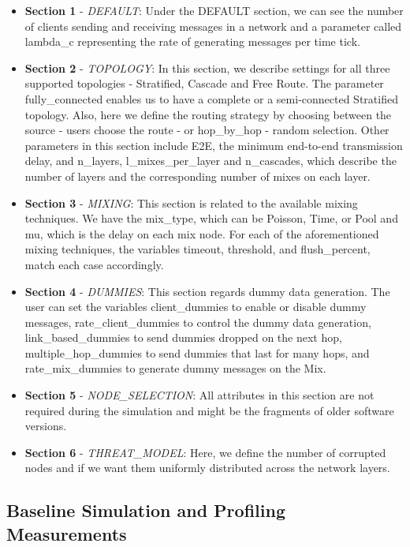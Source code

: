 \documentclass[logo,msc,cyber]{infthesis}   %
\begin{document}
\begin{itemize}
    \item \textbf{Section 1} - \emph{DEFAULT}: Under the DEFAULT section, we can
    see the number of clients sending and receiving messages in a network and a
    parameter called lambda\_c representing the rate of generating messages per
    time tick. 
    \item \textbf{Section 2} - \emph{TOPOLOGY}: In this section, we describe
    settings for all three supported topologies - Stratified, Cascade and Free
    Route. The parameter fully\_connected enables us to have a complete or a
    semi-connected Stratified topology. Also, here we define the routing
    strategy by choosing between the source - users choose the route - or
    hop\_by\_hop - random selection. Other parameters in this section include E2E,
    the minimum end-to-end transmission delay, and n\_layers, l\_mixes\_per\_layer
    and n\_cascades, which describe the number of layers and the corresponding
    number of mixes on each layer.
    \item \textbf{Section 3} - \emph{MIXING}: This section is related to the
    available mixing techniques. We have the mix\_type, which can be Poisson,
    Time, or Pool and mu, which is the delay on each mix node. For each of the
    aforementioned mixing techniques, the variables timeout, threshold, and
    flush\_percent, match each case accordingly.
    \item \textbf{Section 4} - \emph{DUMMIES}: This section regards dummy data
    generation. The user can set the variables client\_dummies to enable or
    disable dummy messages, rate\_client\_dummies to control the dummy data
    generation, link\_based\_dummies to send dummies dropped on the next hop,
    multiple\_hop\_dummies to send dummies that last for many hops, and
    rate\_mix\_dummies to generate dummy messages on the Mix.  
    \item \textbf{Section 5} - \emph{NODE\_SELECTION}: All attributes in this
    section are not required during the simulation and might be the fragments of
    older software versions. 
    \item \textbf{Section 6} - \emph{THREAT\_MODEL}: Here, we define the number
    of corrupted nodes and if we want them uniformly distributed across the
    network layers.
\end{itemize}


\subsection{Baseline Simulation and Profiling Measurements}
\end{document}
